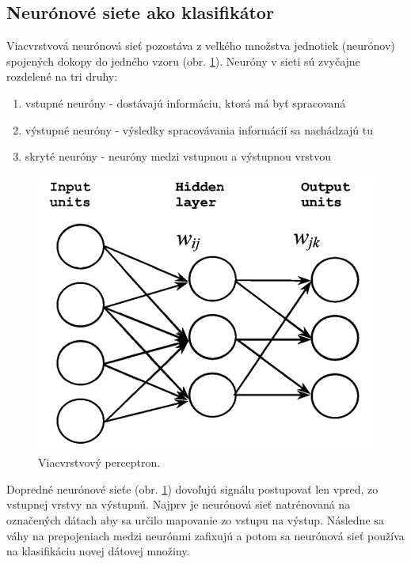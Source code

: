 \subsection{Neurónové siete ako klasifikátor}
Viacvrstvová neurónová sieť pozostáva z veľkého množstva jednotiek (neurónov) spojených dokopy do jedného vzoru (obr. \ref{img:mlp}). Neuróny v sieti sú zvyčajne rozdelené na tri druhy:
\begin{enumerate}
  \item vstupné neuróny - dostávajú informáciu, ktorá má byť spracovaná
  \item výstupné neuróny - výsledky spracovávania informácií sa nachádzajú tu
  \item skryté neuróny - neuróny medzi vstupnou a výstupnou vrstvou
\end{enumerate}
\begin{figure}[H]
	\begin{center}
		\includegraphics[scale=0.4]{img/mlp.png}
		\caption{Viacvrstvový perceptron.}
	\label{img:mlp}
	\end{center}
\end{figure}
\par Dopredné neurónové sieťe (obr. \ref{img:mlp}) dovoľujú signálu postupovať len vpred, zo vstupnej vrstvy na výstupnú. Najprv je neurónová sieť natrénovaná na označených dátach aby sa určilo mapovanie zo vstupu na výstup. Následne sa váhy na prepojeniach medzi neurónmi zafixujú a potom sa  neurónová sieť používa na klasifikáciu novej dátovej množiny.\par
